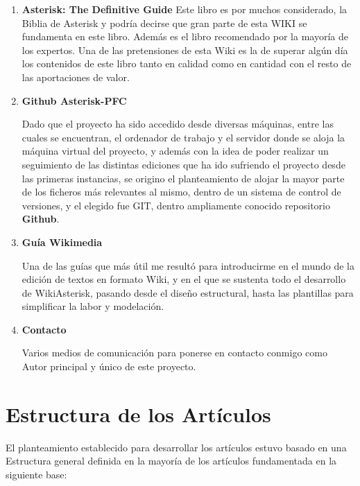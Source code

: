 \begin{enumerate}
	  \setlength{\itemsep}{10pt}

	\item \textbf{Asterisk: The Definitive Guide}
	Este libro es por muchos considerado, la Biblia de Asterisk y podría decirse que gran parte de esta WIKI se fundamenta en este libro. Además es el libro recomendado por la mayoría de los expertos. Una de las pretensiones de esta Wiki es la de superar algún día los contenidos de este libro tanto en calidad como en cantidad con el resto de las aportaciones de valor.
	
	\item \textbf{Github Asterisk-PFC}
	
	Dado que el proyecto ha sido accedido desde diversas máquinas, entre las cuales se encuentran, el ordenador de trabajo y el servidor donde se aloja la máquina virtual del proyecto, y además con la idea de poder realizar un seguimiento de las distintas ediciones que ha ido sufriendo el proyecto desde las primeras instancias, se origino el planteamiento de alojar la mayor parte de los ficheros más relevantes al mismo, dentro de un sistema de control de versiones, y el elegido fue GIT, dentro ampliamente conocido repositorio \textbf{Github}.
	
	\item \textbf{Guía Wikimedia}
	
	Una de las guías que más útil me resultó para introducirme en el mundo de la edición de textos en formato Wiki, y en el que se sustenta todo el desarrollo de WikiAsterisk, pasando desde el diseño estructural, hasta las plantillas para simplificar la labor y modelación.
	
	\item \textbf{Contacto}
	
	Varios medios de comunicación para ponerse en contacto conmigo como Autor principal y único de este proyecto.
	
\end{enumerate}


\section{Estructura de los Artículos}

El planteamiento establecido para desarrollar los artículos estuvo basado en una Estructura general definida en la mayoría de los artículos fundamentada en la siguiente base:

